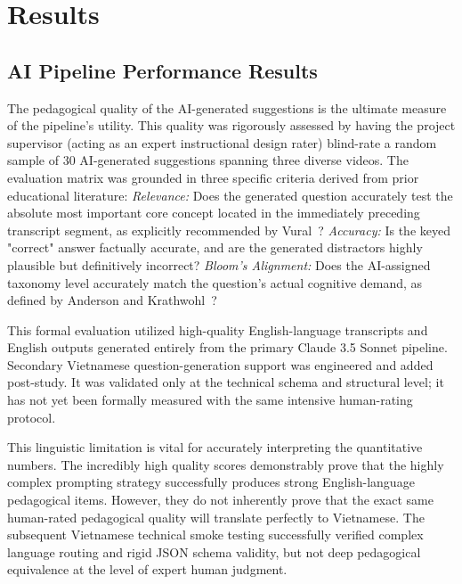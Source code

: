 \section{Results}

\subsection{AI Pipeline Performance Results}

The pedagogical quality of the AI-generated suggestions is the ultimate measure of the pipeline's utility. This quality was rigorously assessed by having the project supervisor (acting as an expert instructional design rater) blind-rate a random sample of 30 AI-generated suggestions spanning three diverse videos. The evaluation matrix was grounded in three specific criteria derived from prior educational literature:
\emph{Relevance:} Does the generated question accurately test the absolute most important core concept located in the immediately preceding transcript segment, as explicitly recommended by Vural~\cite{vural2013}?
\emph{Accuracy:} Is the keyed "correct" answer factually accurate, and are the generated distractors highly plausible but definitively incorrect?
\emph{Bloom's Alignment:} Does the AI-assigned taxonomy level accurately match the question's actual cognitive demand, as defined by Anderson and Krathwohl~\cite{anderson2001}?

This formal evaluation utilized high-quality English-language transcripts and English outputs generated entirely from the primary Claude 3.5 Sonnet pipeline. Secondary Vietnamese question-generation support was engineered and added post-study. It was validated only at the technical schema and structural level; it has not yet been formally measured with the same intensive human-rating protocol.

This linguistic limitation is vital for accurately interpreting the quantitative numbers. The incredibly high quality scores demonstrably prove that the highly complex prompting strategy successfully produces strong English-language pedagogical items. However, they do not inherently prove that the exact same human-rated pedagogical quality will translate perfectly to Vietnamese. The subsequent Vietnamese technical smoke testing successfully verified complex language routing and rigid JSON schema validity, but not deep pedagogical equivalence at the level of expert human judgment.

